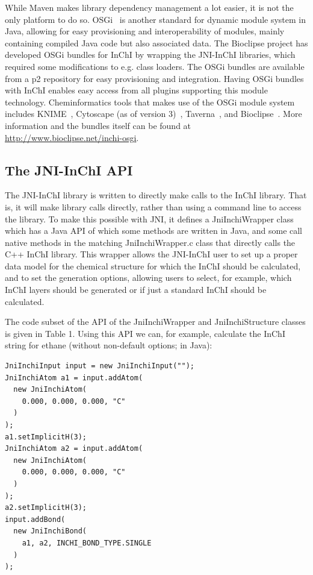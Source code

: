 \documentclass[10pt]{bmc_article}
\newenvironment{bmcformat}{\fussy\setboolean{publ}{true}}{\fussy}
\begin{document}
\begin{bmcformat}
While Maven makes library dependency management a lot easier, it is not the only platform to do so.
OSGi~\cite{osgi} is another standard for dynamic module system in Java, allowing for easy provisioning and interoperability of modules, mainly containing compiled Java code but also associated data. The Bioclipse project has developed OSGi bundles for InChI by wrapping the JNI-InChI libraries, which required some modifications to e.g. class loaders. The OSGi bundles are available from a p2 repository for easy provisioning and integration. Having OSGi bundles with InChI enables easy access from all plugins supporting this module technology. Cheminformatics tools that makes use of the OSGi module system includes KNIME~\cite{Warr:2012kx}, Cytoscape (as of version 3)~\cite{Shannon:2003zr},
Taverna~\cite{Oinn:2004ys,Truszkowski:2011vn}, and Bioclipse~\cite{Spjuth:2007ve}. 
More information and the bundles itself can be found at \url{http://www.bioclipse.net/inchi-osgi}.

\subsection*{The JNI-InChI API}

The JNI-InChI library is written to directly make calls to the InChI library. That is, it will make library calls
directly, rather than using a command line to access the library. To make this possible with JNI, it defines a
JniInchiWrapper class which has a Java API of which some methods are written in Java, and some call native
methods in the matching JniInchiWrapper.c class that directly calls the C++ InChI library.
This wrapper allows the JNI-InChI user to set up a proper data model for the chemical structure for which the
InChI should be calculated, and to set the generation options, allowing users to select, for example, which
InChI layers should be generated or if just a standard InChI should be calculated.

The code subset of the API of the JniInchiWrapper and JniInchiStructure classes is given in Table 1. Using this
API we can, for example, calculate the InChI string for ethane (without non-default options; in Java):

\begin{verbatim}
JniInchiInput input = new JniInchiInput("");
JniInchiAtom a1 = input.addAtom(
  new JniInchiAtom(
    0.000, 0.000, 0.000, "C"
  )
);
a1.setImplicitH(3);
JniInchiAtom a2 = input.addAtom(
  new JniInchiAtom(
    0.000, 0.000, 0.000, "C"
  )
);
a2.setImplicitH(3);
input.addBond(
  new JniInchiBond(
    a1, a2, INCHI_BOND_TYPE.SINGLE
  )
);
  

\end{verbatim}
\end{bmcformat}
\end{document}
